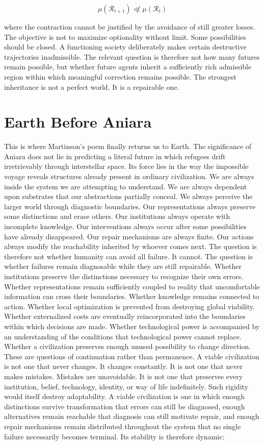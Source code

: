 \documentclass[11pt,oneside]{book}
\theoremstyle{definition}
\theoremstyle{remark}
\begin{document}
\[
\mu(\mathcal{R}_{t+1}) \not\ll \mu(\mathcal{R}_t)
\]

where the contraction cannot be justified by the avoidance of still greater losses. The objective is
not to maximize optionality without limit. Some possibilities should be closed. A functioning
society deliberately makes certain destructive trajectories inadmissible. The relevant question is
therefore not how many futures remain possible, but whether future agents inherit a sufficiently
rich admissible region within which meaningful correction remains possible. The strongest
inheritance is not a perfect world. It is a repairable one.

\section*{Earth Before Aniara}

This is where Martinson's poem finally returns us to Earth. The significance of Aniara does not lie
in predicting a literal future in which refugees drift irretrievably through interstellar space. Its
force lies in the way the impossible voyage reveals structures already present in ordinary
civilization. We are always inside the system we are attempting to understand. We are always
dependent upon substrates that our abstractions partially conceal. We always perceive the larger
world through diagnostic boundaries. Our representations always preserve some distinctions and erase
others. Our institutions always operate with incomplete knowledge. Our interventions always occur
after some possibilities have already disappeared. Our repair mechanisms are always finite. Our
actions always modify the reachability inherited by whoever comes next. The question is therefore
not whether humanity can avoid all failure. It cannot. The question is whether failures remain
diagnosable while they are still repairable. Whether institutions preserve the distinctions
necessary to recognize their own errors. Whether representations remain sufficiently coupled to
reality that uncomfortable information can cross their boundaries. Whether knowledge remains
connected to action. Whether local optimization is prevented from destroying global viability.
Whether externalized costs are eventually reincorporated into the boundaries within which decisions
are made. Whether technological power is accompanied by an understanding of the conditions that
technological power cannot replace. Whether a civilization preserves enough unused possibility to
change direction. These are questions of continuation rather than permanence. A viable civilization
is not one that never changes. It changes constantly. It is not one that never makes mistakes.
Mistakes are unavoidable. It is not one that preserves every institution, belief, technology,
identity, or way of life indefinitely. Such rigidity would itself destroy adaptability. A viable
civilization is one in which enough distinctions survive transformation that errors can still be
diagnosed, enough alternatives remain reachable that diagnosis can still motivate repair, and enough
repair mechanisms remain distributed throughout the system that no single failure necessarily
becomes terminal. Its stability is therefore dynamic:
\end{document}
